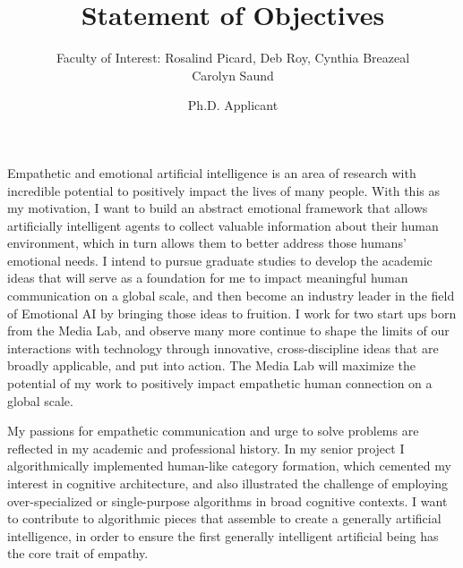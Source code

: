 \documentclass{article}
\title{Statement of Objectives}
\author{Faculty of Interest: Rosalind Picard, Deb Roy, Cynthia Breazeal \\ Carolyn Saund}
\date{Ph.D. Applicant}
\begin{document}
  \maketitle%
  \thispagestyle{empty}
  \vspace{16pt}

	Empathetic and emotional artificial intelligence is an area of research with incredible potential to positively impact the lives of many people. With this as my motivation, I want to build an abstract emotional framework that allows artificially intelligent agents to collect valuable information about their human environment, which in turn allows them to better address those humans' emotional needs. I intend to pursue graduate studies to develop the academic ideas that will serve as a foundation for me to impact meaningful human communication on a global scale, and then become an industry leader in the field of Emotional AI by bringing those ideas to fruition. I work for two start ups born from the Media Lab, and observe many more continue to shape the limits of our interactions with technology through innovative, cross-discipline ideas that are broadly applicable, and put into action. The Media Lab will maximize the potential of my work to positively impact empathetic human connection on a global scale. \par
	My passions for empathetic communication and urge to solve problems are reflected in my academic and professional history. In my senior project I algorithmically implemented human-like category formation, which cemented my interest in cognitive architecture, and also illustrated the challenge of employing over-specialized or single-purpose algorithms in broad cognitive contexts. I want to contribute to algorithmic pieces that assemble to create a generally artificial intelligence, in order to ensure the first generally intelligent artificial being has the core trait of empathy. \par
\end{document}
